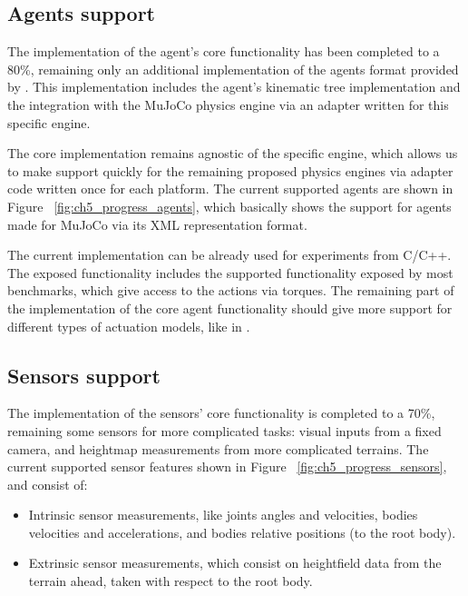 \subsection*{Agents support}

The implementation of the agent's core functionality has been completed to a 80\%,
remaining only an additional implementation of the agents format provided by \cite{TerrainRLSim}.
This implementation includes the agent's kinematic tree implementation and the integration 
with the MuJoCo physics engine via an adapter written for this specific engine.

The core implementation remains agnostic of the specific engine, which allows us
to make support quickly for the remaining proposed physics engines via adapter code
written once for each platform. The current supported agents are shown in Figure ~\ref{fig:ch5_progress_agents},
which basically shows the support for agents made for MuJoCo via its XML representation format.

The current implementation can be already used for experiments from C/C++. The exposed
functionality includes the supported functionality exposed by most benchmarks, which
give access to the actions via torques. The remaining part of the implementation of the core
agent functionality should give more support for different types of actuation models, like in \cite{ActuationChoice}.

\figProgressAgents

\subsection*{Sensors support}

The implementation of the sensors' core functionality is completed to a 70\%,
remaining some sensors for more complicated tasks: visual inputs from a fixed camera,
and heightmap measurements from more complicated terrains. The current supported sensor
features shown in Figure ~\ref{fig:ch5_progress_sensors}, and consist of:

\begin{itemize}
    \item Intrinsic sensor measurements, like joints angles and velocities, bodies velocities
          and accelerations, and bodies relative positions (to the root body).
    \item Extrinsic sensor measurements, which consist on heightfield data from the terrain ahead,
          taken with respect to the root body.
\end{itemize}

